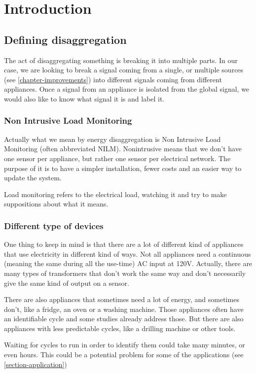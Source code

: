 \chapter{Introduction}
\cite{barker2014nilm} %
\section{Defining disaggregation}
The act of disaggregating something is breaking it into multiple parts. In our case, we are looking to break a signal coming from a single, or multiple sources (see \autoref{chapter-improvements}) into different signals coming from different appliances. Once a signal from an appliance is isolated from the global signal, we would also like to know what signal it is and label it.

\subsection{Non Intrusive Load Monitoring}
Actually what we mean by energy disaggregation is Non Intrusive Load Monitoring (often abbreviated NILM). Nonintrusive means that we don't have one sensor per appliance, but rather one sensor per electrical network. The purpose of it is to have a simpler installation, fewer costs and an easier way to update the system.

Load monitoring refers to the electrical load, watching it and try to make suppositions about what it means.

\subsection{Different type of devices}
One thing to keep in mind is that there are a lot of different kind of appliances that use electricity in different kind of ways. Not all appliances need a continuous (meaning the same during all the use-time) AC input at 120V. Actually, there are many types of transformers\cite{harlow2004electric} that don't work the same way and don't necessarily give the same kind of output on a sensor.

There are also appliances that sometimes need a lot of energy, and sometimes don't, like a fridge, an oven or a washing machine. Those appliances often have an identifiable cycle and some studies already address those. But there are also appliances with less predictable cycles, like a drilling machine or other tools.

Waiting for cycles to run in order to identify them could take many minutes, or even hours. This could be a potential problem for some of the applications (see \autoref{section-application})

